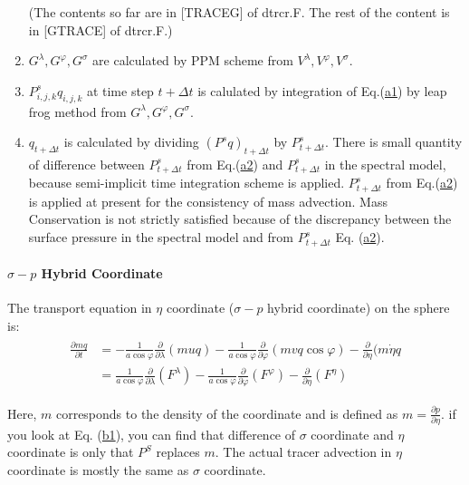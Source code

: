 \begin{enumerate}
  (The contents so far are in {[}TRACEG{]} of dtrcr.F. The rest of the content is in {[}GTRACE{]} of dtrcr.F.)
\item
  \(G^{\lambda}, G^{\varphi}, G^{\sigma}\) are calculated by PPM scheme from \(V^{\lambda}, V^{\varphi}, V^{\sigma}\).
\item
  \(P^{s}_{i,j,k}q_{i,j,k}\) at time step \(t+\Delta t\) is calulated by integration of Eq.(\url{a1}) by leap frog method from \(G^{\lambda}, G^{\varphi}, G^{\sigma}\).
\item
  \(q_{t+\Delta t}\) is calculated by dividing \((P^{s}q)_{t+\Delta t}\) by \(P^{s}_{t+\Delta t}\). There is small quantity of difference between \(P^{s}_{t+\Delta t}\) from Eq.(\url{a2}) and
  \(P^{s}_{t+\Delta t}\) in the spectral model, because semi-implicit time integration scheme is applied. \(P^{s}_{t+\Delta t}\) from Eq.(\url{a2}) is applied at present for the consistency of mass
  advection. Mass Conservation is not strictly satisfied because of the discrepancy between the surface pressure in the spectral model and from \(P^{s}_{t+\Delta t}\) Eq. (\url{a2}).
\end{enumerate}

\hypertarget{sigma---p-hybrid-coordinate}{%
\paragraph{\texorpdfstring{\(\sigma - p\) Hybrid Coordinate}{\textbackslash sigma - p Hybrid Coordinate}}\label{sigma---p-hybrid-coordinate}}

The transport equation in \(\eta\) coordinate (\(\sigma-p\) hybrid coordinate) on the sphere is: \begin{eqnarray}
\begin{aligned}
\frac{\partial mq}{\partial t} &= - \frac{1}{a \cos \varphi} \frac{\partial}{\partial \lambda}(muq)- \frac{1}{a \cos \varphi} \frac{\partial}{\partial \varphi}(mvq \cos \varphi)- \frac{\partial}{\partial \eta} (m \dot{\eta} q \\                                                                         &= \frac{1}{a \cos \varphi} \frac{\partial}{\partial \lambda}(F^{\lambda})- \frac{1}{a \cos \varphi} \frac{\partial}{\partial \varphi}(F^{\varphi})-\frac{\partial}{\partial \eta} (F^{\eta})\end{aligned}\end{eqnarray}

Here, \(m\) corresponds to the density of the coordinate and is defined as \(m=\frac{\partial p}{\partial \eta}\). if you look at Eq. (\url{b1}), you can find that difference of \(\sigma\) coordinate
and \(\eta\) coordinate is only that \(P^{S}\) replaces \(m\). The actual tracer advection in \(\eta\) coordinate is mostly the same as \(\sigma\) coordinate.

